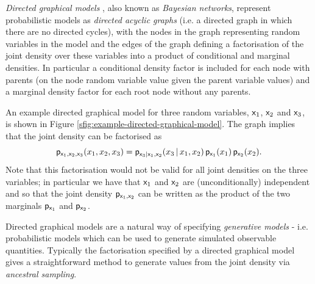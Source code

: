 \emph{Directed graphical models} \citep{pearl1988probabilistic}, also known as \emph{Bayesian networks}, represent probabilistic models as \emph{directed acyclic graphs} (i.e. a directed graph in which there are no directed cycles), with the nodes in the graph representing random variables in the model and the edges of the graph defining a factorisation of the joint density over these variables into a product of conditional and marginal densities. In particular a conditional density factor is included for each node with parents (on the node random variable value given the parent variable values) and a marginal density factor for each root node without any parents.

An example directed graphical model for three random variables, $\mathsf{x}_1$, $\mathsf{x}_2$ and $\mathsf{x}_3$, is shown in Figure \ref{sfig:example-directed-graphical-model}. The graph implies that the joint density can be factorised as
\begin{equation}\label{eq:example-directed-graphical-model-factorisation}
  \mathsf{p}_{\mathsf{x}_1,\mathsf{x}_2,\mathsf{x}_3}(x_1,x_2,x_3) = 
  \mathsf{p}_{\mathsf{x}_3|\mathsf{x}_1,\mathsf{x}_2}(x_3 \operatorname{|} x_1,x_2) \,
  \mathsf{p}_{\mathsf{x}_1}(x_1) \, \mathsf{p}_{\mathsf{x}_2}(x_2).
\end{equation}
Note that this factorisation would not be valid for all joint densities on the three variables; in particular we have that $\mathsf{x}_1$ and $\mathsf{x}_2$ are (unconditionally) independent and so that the joint density $\mathsf{p}_{\mathsf{x}_1,\mathsf{x}_2}$ can be written as the product of the two marginals $\mathsf{p}_{\mathsf{x}_1}$ and $\mathsf{p}_{\mathsf{x}_2}$.

Directed graphical models are a natural way of specifying \emph{generative models} - i.e. probabilistic models which can be used to generate simulated observable quantities. Typically the factorisation specified by a directed graphical model gives a straightforward method to generate values from the joint density via \emph{ancestral sampling}.


